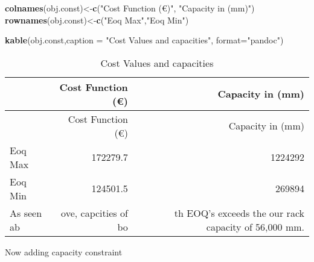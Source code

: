 \documentclass[
]{article}
\newenvironment{Shaded}{\begin{snugshade}}{\end{snugshade}}
\newcommand{\CommentTok}[1]{\textcolor[rgb]{0.56,0.35,0.01}{\textit{#1}}}
\newcommand{\DataTypeTok}[1]{\textcolor[rgb]{0.13,0.29,0.53}{#1}}
\newcommand{\KeywordTok}[1]{\textcolor[rgb]{0.13,0.29,0.53}{\textbf{#1}}}
\newcommand{\NormalTok}[1]{#1}
\newcommand{\OperatorTok}[1]{\textcolor[rgb]{0.81,0.36,0.00}{\textbf{#1}}}
\newcommand{\StringTok}[1]{\textcolor[rgb]{0.31,0.60,0.02}{#1}}
\begin{document}
\begin{Shaded}
\end{Shaded}

\begin{Shaded}
\begin{Highlighting}[]
\KeywordTok{colnames}\NormalTok{(obj.const)<-}\KeywordTok{c}\NormalTok{(}\StringTok{"Cost Function (€)"}\NormalTok{, }\StringTok{"Capacity in (mm)"}\NormalTok{) }
\KeywordTok{rownames}\NormalTok{(obj.const)<-}\KeywordTok{c}\NormalTok{(}\StringTok{"Eoq Max"}\NormalTok{,}\StringTok{"Eoq Min"}\NormalTok{)}

\KeywordTok{kable}\NormalTok{(obj.const,}\DataTypeTok{caption =} \StringTok{"Cost Values and capacities"}\NormalTok{, }\DataTypeTok{format=}\StringTok{"pandoc"}\NormalTok{)}
\end{Highlighting}
\end{Shaded}

\begin{longtable}[]{@{}lrr@{}}
\caption{Cost Values and capacities}\tabularnewline
\toprule
& Cost Function (€) & Capacity in (mm)\tabularnewline
\midrule
\endfirsthead
\toprule
& Cost Function (€) & Capacity in (mm)\tabularnewline
\midrule
\endhead
Eoq Max & 172279.7 & 1224292\tabularnewline
Eoq Min & 124501.5 & 269894\tabularnewline
As seen ab & ove, capcities of bo & th EOQ's exceeds the our rack
capacity of 56,000 mm.\tabularnewline
\bottomrule
\end{longtable}

Now adding capacity constraint
\end{document}
